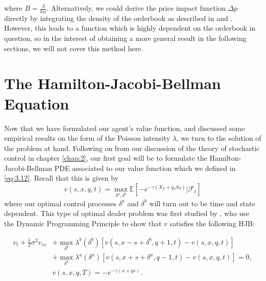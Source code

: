 where $B=\frac{\Lambda}{k\alpha}$.
Alternatively, we could derive the price impact function $\Delta p$ directly by 
integrating the density of the orderbook as described in \textcite{Weber2005}
and \textcite{Smith2003}. However, this leads to a function which is highly dependent
on the orderbook in question, so in the interest of obtaining a more general result
in the following sections, we will not cover this method here.

\newpage
\section{The Hamilton-Jacobi-Bellman Equation}\label{sec:3.7}

Now that we have formulated our agent's value function, and discussed 
some empirical results on the form of the Poisson intensity $\lambda$,
we turn to the solution of the problem at hand. Following on from our 
discussion of the theory of stochastic control in chapter \ref{chap:2},
our first goal will be to formulate the Hamilton-Jacobi-Bellman PDE
associated to our value function which we defined in \eqref{eq:3.12}.
Recall that this is given by
\begin{equation}
    v(s,x,q,t)=\max\limits_{\delta^a,\delta^b}\mathbb{E}\left[-e^{-\gamma(X_T+q_TS_T)}|\mathcal{F}_t\right]
\end{equation}
where our optimal control processes $\delta^a$ and $\delta^b$ will
turn out to be time and state dependent. This type of optimal dealer 
problem was first studied by \textcite{HS1981}, who use the Dynamic Programming 
Principle to show that $v$ satisfies the following HJB:
\begin{theorem}
    \begin{equation}\label{eq:3.17}
            \begin{aligned}
                v_t+\frac{1}{2}\sigma^2v_{ss}&+\max\limits_{\delta^b}\lambda^b(\delta^b)[v(s,x-s+\delta^b,q+1,t)-v(s,x,q,t)]\\
                &+\max\limits_{\delta^a}\lambda^a(\delta^a)[v(s,x+s+\delta^a,q-1,t)-v(s,x,q,t)]=0,\\
                &v(s,x,q,T)=-e^{-\gamma(x+qs)}.
            \end{aligned}
    \end{equation}
\end{theorem}
